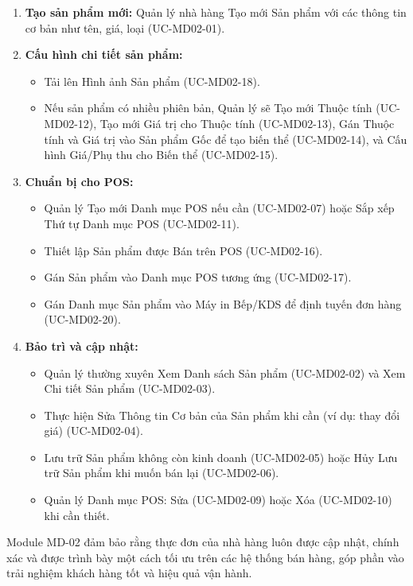 \begin{enumerate}
    \item \textbf{Tạo sản phẩm mới:} Quản lý nhà hàng Tạo mới Sản phẩm với các thông tin cơ bản như tên, giá, loại (UC-MD02-01).
    \item \textbf{Cấu hình chi tiết sản phẩm:}
        \begin{itemize}
            \item Tải lên Hình ảnh Sản phẩm (UC-MD02-18).
            \item Nếu sản phẩm có nhiều phiên bản, Quản lý sẽ Tạo mới Thuộc tính (UC-MD02-12), Tạo mới Giá trị cho Thuộc tính (UC-MD02-13), Gán Thuộc tính và Giá trị vào Sản phẩm Gốc để tạo biến thể (UC-MD02-14), và Cấu hình Giá/Phụ thu cho Biến thể (UC-MD02-15).
        \end{itemize}
    \item \textbf{Chuẩn bị cho POS:}
        \begin{itemize}
            \item Quản lý Tạo mới Danh mục POS nếu cần (UC-MD02-07) hoặc Sắp xếp Thứ tự Danh mục POS (UC-MD02-11).
            \item Thiết lập Sản phẩm được Bán trên POS (UC-MD02-16).
            \item Gán Sản phẩm vào Danh mục POS tương ứng (UC-MD02-17).
            \item Gán Danh mục Sản phẩm vào Máy in Bếp/KDS để định tuyến đơn hàng (UC-MD02-20).
        \end{itemize}
    \item \textbf{Bảo trì và cập nhật:}
        \begin{itemize}
            \item Quản lý thường xuyên Xem Danh sách Sản phẩm (UC-MD02-02) và Xem Chi tiết Sản phẩm (UC-MD02-03).
            \item Thực hiện Sửa Thông tin Cơ bản của Sản phẩm khi cần (ví dụ: thay đổi giá) (UC-MD02-04).
            \item Lưu trữ Sản phẩm không còn kinh doanh (UC-MD02-05) hoặc Hủy Lưu trữ Sản phẩm khi muốn bán lại (UC-MD02-06).
            \item Quản lý Danh mục POS: Sửa (UC-MD02-09) hoặc Xóa (UC-MD02-10) khi cần thiết.
        \end{itemize}
\end{enumerate}
Module MD-02 đảm bảo rằng thực đơn của nhà hàng luôn được cập nhật, chính xác và được trình bày một cách tối ưu trên các hệ thống bán hàng, góp phần vào trải nghiệm khách hàng tốt và hiệu quả vận hành.

